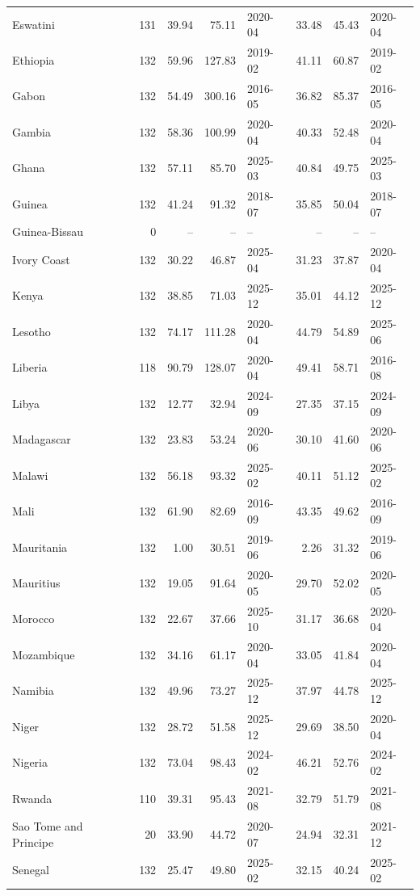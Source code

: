 \begin{longtable}{lrrrlrrl}
Eswatini & 131 & 39.94 & 75.11 & 2020-04 & 33.48 & 45.43 & 2020-04\\
Ethiopia & 132 & 59.96 & 127.83 & 2019-02 & 41.11 & 60.87 & 2019-02\\
Gabon & 132 & 54.49 & 300.16 & 2016-05 & 36.82 & 85.37 & 2016-05\\
Gambia & 132 & 58.36 & 100.99 & 2020-04 & 40.33 & 52.48 & 2020-04\\
Ghana & 132 & 57.11 & 85.70 & 2025-03 & 40.84 & 49.75 & 2025-03\\
Guinea & 132 & 41.24 & 91.32 & 2018-07 & 35.85 & 50.04 & 2018-07\\
Guinea-Bissau & 0 & -- & -- & -- & -- & -- & --\\
Ivory Coast & 132 & 30.22 & 46.87 & 2025-04 & 31.23 & 37.87 & 2020-04\\
Kenya & 132 & 38.85 & 71.03 & 2025-12 & 35.01 & 44.12 & 2025-12\\
Lesotho & 132 & 74.17 & 111.28 & 2020-04 & 44.79 & 54.89 & 2025-06\\
Liberia & 118 & 90.79 & 128.07 & 2020-04 & 49.41 & 58.71 & 2016-08\\
Libya & 132 & 12.77 & 32.94 & 2024-09 & 27.35 & 37.15 & 2024-09\\
Madagascar & 132 & 23.83 & 53.24 & 2020-06 & 30.10 & 41.60 & 2020-06\\
Malawi & 132 & 56.18 & 93.32 & 2025-02 & 40.11 & 51.12 & 2025-02\\
Mali & 132 & 61.90 & 82.69 & 2016-09 & 43.35 & 49.62 & 2016-09\\
Mauritania & 132 & 1.00 & 30.51 & 2019-06 & 2.26 & 31.32 & 2019-06\\
Mauritius & 132 & 19.05 & 91.64 & 2020-05 & 29.70 & 52.02 & 2020-05\\
Morocco & 132 & 22.67 & 37.66 & 2025-10 & 31.17 & 36.68 & 2020-04\\
Mozambique & 132 & 34.16 & 61.17 & 2020-04 & 33.05 & 41.84 & 2020-04\\
Namibia & 132 & 49.96 & 73.27 & 2025-12 & 37.97 & 44.78 & 2025-12\\
Niger & 132 & 28.72 & 51.58 & 2025-12 & 29.69 & 38.50 & 2020-04\\
Nigeria & 132 & 73.04 & 98.43 & 2024-02 & 46.21 & 52.76 & 2024-02\\
Rwanda & 110 & 39.31 & 95.43 & 2021-08 & 32.79 & 51.79 & 2021-08\\
Sao Tome and Principe & 20 & 33.90 & 44.72 & 2020-07 & 24.94 & 32.31 & 2021-12\\
Senegal & 132 & 25.47 & 49.80 & 2025-02 & 32.15 & 40.24 & 2025-02\\

\end{longtable}
